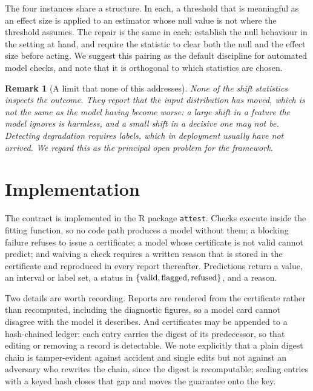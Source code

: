 \documentclass[11pt,a4paper]{article}
\newtheorem{remark}{Remark}
\theoremstyle{definition}
\begin{document}
The four instances share a structure. In each, a threshold that is meaningful
as an effect size is applied to an estimator whose null value is not where the
threshold assumes. The repair is the same in each: establish the null
behaviour in the setting at hand, and require the statistic to clear both the
null and the effect size before acting. We suggest this pairing as the default
discipline for automated model checks, and note that it is orthogonal to which
statistics are chosen.

\begin{remark}[A limit that none of this addresses]
None of the shift statistics inspects the outcome. They report that the input
distribution has moved, which is not the same as the model having become
worse: a large shift in a feature the model ignores is harmless, and a small
shift in a decisive one may not be. Detecting degradation requires labels,
which in deployment usually have not arrived. We regard this as the principal
open problem for the framework.
\end{remark}

\section{Implementation}
\label{sec:impl}

The contract is implemented in the \textsf{R} package \texttt{attest}. Checks
execute inside the fitting function, so no code path produces a model without
them; a blocking failure refuses to issue a certificate; a model whose
certificate is not valid cannot predict; and waiving a check requires a written
reason that is stored in the certificate and reproduced in every report
thereafter. Predictions return a value, an interval or label set, a status in
$\{\textup{valid}, \textup{flagged}, \textup{refused}\}$, and a reason.

Two details are worth recording. Reports are rendered from the certificate
rather than recomputed, including the diagnostic figures, so a model card
cannot disagree with the model it describes. And certificates may be appended
to a hash-chained ledger: each entry carries the digest of its predecessor, so
that editing or removing a record is detectable. We note explicitly that a
plain digest chain is tamper-evident against accident and single edits but not
against an adversary who rewrites the chain, since the digest is recomputable;
sealing entries with a keyed hash closes that gap and moves the guarantee onto
the key.
\end{document}
